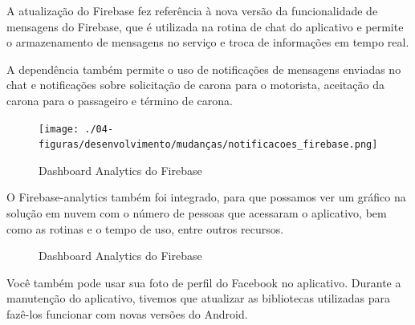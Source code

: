 A atualização do Firebase fez referência à nova versão da funcionalidade de mensagens do Firebase, que é utilizada na rotina de chat do aplicativo e permite o armazenamento de mensagens no serviço e troca de informações em tempo real.

A dependência também permite o uso de notificações de mensagens enviadas no chat e notificações sobre solicitação de carona para o motorista, aceitação da carona para o passageiro e término de carona.

\begin{figure}[!hbtp]
	\centering
	\caption{Dashboard Analytics do Firebase}
	\texttt{[image: ./04-figuras/desenvolvimento/mudanças/notificacoes\_firebase.png]}
	\label{fig:facebook_analytics}
\end{figure}

O Firebase-analytics também foi integrado, para que possamos ver um gráfico na solução em nuvem com o número de pessoas que acessaram o aplicativo, bem como as rotinas e o tempo de uso, entre outros recursos.

\begin{figure}[h]
	\center
	\qquad
	\caption{Dashboard Analytics do Firebase}
\end{figure}

Você também pode usar sua foto de perfil do Facebook no aplicativo. Durante a manutenção do aplicativo, tivemos que atualizar as bibliotecas utilizadas para fazê-los funcionar com novas versões do Android.

